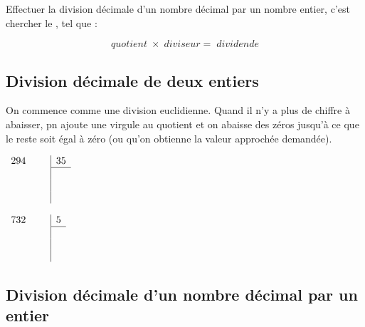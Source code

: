 \begin{mydef}
	Effectuer la division décimale d'un nombre décimal par un nombre entier, c'est chercher le , tel que : 
	
	\begin{equation*}
	quotient \; \times \; diviseur = \; dividende
	\end{equation*}
\end{mydef}

\subsection{Division décimale de deux entiers}

\begin{mymeth}
	On commence comme une division euclidienne. Quand il n'y a plus de chiffre à abaisser, pn ajoute une virgule au quotient et on abaisse des zéros jusqu'à ce que le reste soit égal à zéro (ou qu'on obtienne la valeur approchée demandée).
\end{mymeth}

\begin{myexs}
	\begin{multicols}{2}
		\begin{center}
					$\begin{array}{rc|c}
					294 \quad & & 35 \\
					\cline{3-3}
					 &  \\
					 & & \\
					 & & \\
					\end{array}$
		\end{center}
		
		
		\begin{center}
			$\begin{array}{rc|c}
			732 \quad & & 5 \\
			\cline{3-3}
			&  \\
			& & \\
			& & \\
			\end{array}$
			
		\end{center}
		
	\end{multicols}
\end{myexs}


\subsection{Division décimale d'un nombre décimal par un entier}

